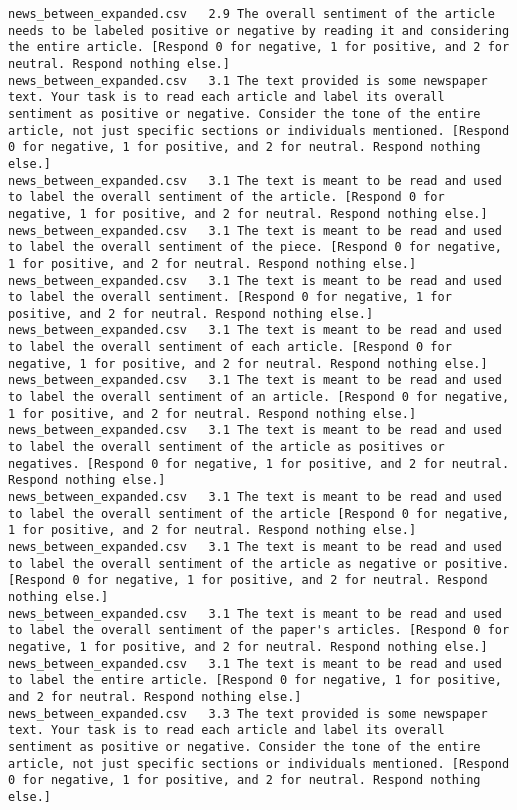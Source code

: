 \begin{lstlisting}[label=lst:promptvariants]
news_between_expanded.csv	2.9	The overall sentiment of the article needs to be labeled positive or negative by reading it and considering the entire article. [Respond 0 for negative, 1 for positive, and 2 for neutral. Respond nothing else.]
news_between_expanded.csv	3.1	The text provided is some newspaper text. Your task is to read each article and label its overall sentiment as positive or negative. Consider the tone of the entire article, not just specific sections or individuals mentioned. [Respond 0 for negative, 1 for positive, and 2 for neutral. Respond nothing else.]
news_between_expanded.csv	3.1	The text is meant to be read and used to label the overall sentiment of the article. [Respond 0 for negative, 1 for positive, and 2 for neutral. Respond nothing else.]
news_between_expanded.csv	3.1	The text is meant to be read and used to label the overall sentiment of the piece. [Respond 0 for negative, 1 for positive, and 2 for neutral. Respond nothing else.]
news_between_expanded.csv	3.1	The text is meant to be read and used to label the overall sentiment. [Respond 0 for negative, 1 for positive, and 2 for neutral. Respond nothing else.]
news_between_expanded.csv	3.1	The text is meant to be read and used to label the overall sentiment of each article. [Respond 0 for negative, 1 for positive, and 2 for neutral. Respond nothing else.]
news_between_expanded.csv	3.1	The text is meant to be read and used to label the overall sentiment of an article. [Respond 0 for negative, 1 for positive, and 2 for neutral. Respond nothing else.]
news_between_expanded.csv	3.1	The text is meant to be read and used to label the overall sentiment of the article as positives or negatives. [Respond 0 for negative, 1 for positive, and 2 for neutral. Respond nothing else.]
news_between_expanded.csv	3.1	The text is meant to be read and used to label the overall sentiment of the article [Respond 0 for negative, 1 for positive, and 2 for neutral. Respond nothing else.]
news_between_expanded.csv	3.1	The text is meant to be read and used to label the overall sentiment of the article as negative or positive. [Respond 0 for negative, 1 for positive, and 2 for neutral. Respond nothing else.]
news_between_expanded.csv	3.1	The text is meant to be read and used to label the overall sentiment of the paper's articles. [Respond 0 for negative, 1 for positive, and 2 for neutral. Respond nothing else.]
news_between_expanded.csv	3.1	The text is meant to be read and used to label the entire article. [Respond 0 for negative, 1 for positive, and 2 for neutral. Respond nothing else.]
news_between_expanded.csv	3.3	The text provided is some newspaper text. Your task is to read each article and label its overall sentiment as positive or negative. Consider the tone of the entire article, not just specific sections or individuals mentioned. [Respond 0 for negative, 1 for positive, and 2 for neutral. Respond nothing else.]

\end{lstlisting}
